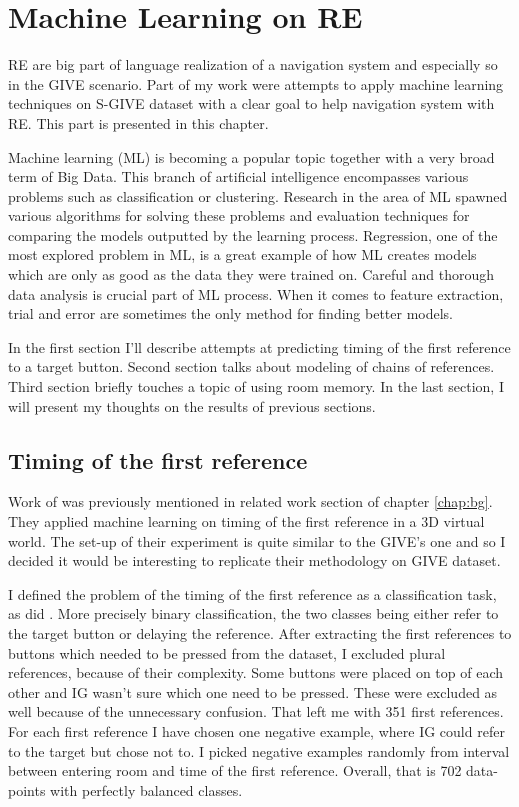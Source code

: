 \chapter{Machine Learning on RE}
\label{chap:ml}
RE are big part of language realization of a navigation system and especially so in the GIVE scenario. Part of my work were attempts to apply machine learning techniques on S-GIVE dataset with a clear goal to help navigation system with RE. This part is presented in this chapter.

Machine learning (ML) is becoming a popular topic together with a very broad term of Big Data. This branch of artificial intelligence encompasses various problems such as classification or clustering. Research in the area of ML spawned various algorithms for solving these problems and evaluation techniques for comparing the models outputted by the learning process. Regression, one of the most explored problem in ML, is a great example of how ML creates models which are only as good as the data they were trained on. Careful and thorough data analysis is crucial part of ML process. When it comes to feature extraction, trial and error are sometimes the only method for finding better models. 

In the first section I'll describe attempts at predicting timing of the first reference to a target button. Second section talks about modeling of chains of references. Third section briefly touches a topic of using room memory. In the last section, I will present my thoughts on the results of previous sections.

\section{Timing of the first reference}
\label{sec:timing-firsref-ml}
Work of \citet{stoia2006sentence} was previously mentioned in related work section of chapter \ref{chap:bg}. They applied machine learning on timing of the first reference in a 3D virtual world. The set-up of their experiment is quite similar to the GIVE's one and so I decided it would be interesting to replicate their methodology on GIVE dataset. 

I defined the problem of the timing of the first reference as a classification task, as did \citet{stoia2006sentence}. More precisely binary classification, the two classes being either refer to the target button or delaying the reference. After extracting the first references to buttons which needed to be pressed from the dataset, I excluded plural references, because of their complexity. Some buttons were placed on top of each other and IG wasn't sure which one need to be pressed. These were excluded as well because of the unnecessary confusion. That left me with 351 first references. For each first reference I have chosen one negative example, where IG could refer to the target but chose not to. I picked negative examples randomly from interval between entering room and time of the first reference. Overall, that is 702 data-points with perfectly balanced classes.

